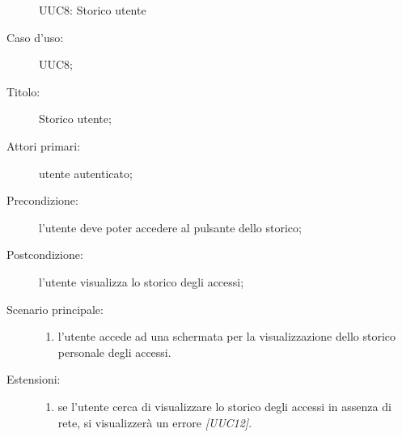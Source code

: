 \documentclass[../../../analisi-dei-requisiti.tex]{subfiles}
\begin{document}
\begin{figure}[H]
  \centering
  \caption{UUC8: Storico utente}%
  \label{fig:uuc8}
\end{figure}

\begin{description}
  \item[Caso d’uso:] UUC8;
  \item[Titolo:] Storico utente;
  \item[Attori primari:] utente autenticato;
  \item[Precondizione:]  l'utente deve poter accedere al pulsante dello storico;
  \item[Postcondizione:] l'utente visualizza lo storico degli accessi;
  \item[Scenario principale:]
        \begin{enumerate}
          \item l'utente accede ad una schermata per la visualizzazione dello storico personale degli accessi.
        \end{enumerate}
  \item[Estensioni:]
        \begin{enumerate}
          \item se l'utente cerca di visualizzare lo storico degli accessi in assenza di rete, si visualizzerà un errore \emph{[UUC12]}.
        \end{enumerate}
\end{description}
\end{document}
